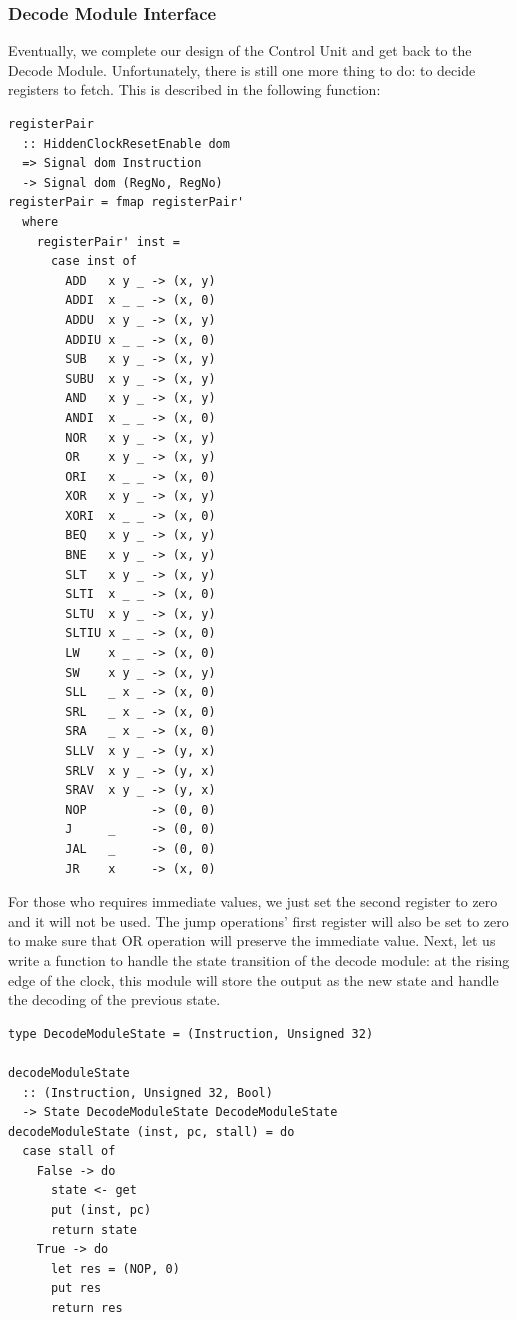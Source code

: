 \documentclass[a4paper,12pt, oneside]{book}
\begin{document}
\subsubsection{Decode Module Interface}
Eventually, we complete our design of the Control Unit and get back to the Decode Module. Unfortunately, there is still one more thing to do: to decide registers to fetch. This is described in the following function:
\begin{verbatim}
registerPair 
  :: HiddenClockResetEnable dom
  => Signal dom Instruction
  -> Signal dom (RegNo, RegNo)
registerPair = fmap registerPair'
  where
    registerPair' inst =
      case inst of
        ADD   x y _ -> (x, y)
        ADDI  x _ _ -> (x, 0)
        ADDU  x y _ -> (x, y)
        ADDIU x _ _ -> (x, 0)
        SUB   x y _ -> (x, y)
        SUBU  x y _ -> (x, y)
        AND   x y _ -> (x, y)
        ANDI  x _ _ -> (x, 0)
        NOR   x y _ -> (x, y)
        OR    x y _ -> (x, y)
        ORI   x _ _ -> (x, 0)
        XOR   x y _ -> (x, y)
        XORI  x _ _ -> (x, 0)
        BEQ   x y _ -> (x, y)
        BNE   x y _ -> (x, y)
        SLT   x y _ -> (x, y)
        SLTI  x _ _ -> (x, 0)
        SLTU  x y _ -> (x, y)
        SLTIU x _ _ -> (x, 0)
        LW    x _ _ -> (x, 0)
        SW    x y _ -> (x, y)
        SLL   _ x _ -> (x, 0)
        SRL   _ x _ -> (x, 0)
        SRA   _ x _ -> (x, 0)
        SLLV  x y _ -> (y, x)
        SRLV  x y _ -> (y, x)
        SRAV  x y _ -> (y, x)
        NOP         -> (0, 0)
        J     _     -> (0, 0)
        JAL   _     -> (0, 0)
        JR    x     -> (x, 0)
\end{verbatim}
For those who requires immediate values, we just set the second register to zero and it will not be used. The jump operations' first register will also be set to zero to make sure that OR operation will preserve the immediate value.
Next, let us write a function to handle the state transition of the decode module: at the rising edge of the clock, this module will store the output as the new state and handle the decoding of the previous state.
\begin{verbatim}
type DecodeModuleState = (Instruction, Unsigned 32)

decodeModuleState 
  :: (Instruction, Unsigned 32, Bool)
  -> State DecodeModuleState DecodeModuleState
decodeModuleState (inst, pc, stall) = do
  case stall of
    False -> do
      state <- get
      put (inst, pc)
      return state
    True -> do
      let res = (NOP, 0)
      put res
      return res
\end{verbatim}
\end{document}

